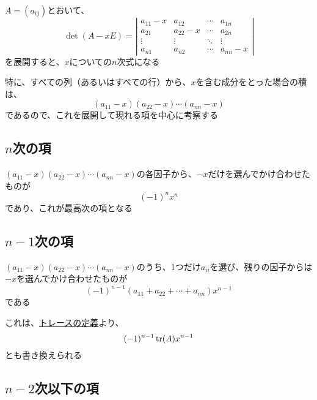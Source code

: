 \documentclass[../../../topic_linear-algebra]{subfiles}
\begin{document}
\sectionline

$A = (a_{ij})$とおいて、
\begin{equation*}
  \det(A - xE ) = \left|\begin{matrix}
    a_{11} - x & a_{12}     & \cdots & a_{1n}     \\
    a_{21}     & a_{22} - x & \cdots & a_{2n}     \\
    \vdots     & \vdots     & \ddots & \vdots     \\
    a_{n1}     & a_{n2}     & \cdots & a_{nn} - x
  \end{matrix}\right|
\end{equation*}
を展開すると、$x$についての$n$次式になる

特に、すべての列（あるいはすべての行）から、$x$を含む成分をとった場合の積は、
\begin{equation*}
  (a_{11} - x)(a_{22} - x) \cdots (a_{nn} - x)
\end{equation*}
であるので、これを展開して現れる項を中心に考察する

\subsection{$n$次の項}

$(a_{11} - x)(a_{22} - x) \cdots (a_{nn} - x)$の各因子から、$-x$だけを選んでかけ合わせたものが
\begin{equation*}
  (-1)^n x^n
\end{equation*}
であり、これが最高次の項となる

\subsection{$n-1$次の項}

$(a_{11} - x)(a_{22} - x) \cdots (a_{nn} - x)$のうち、1つだけ$a_{ii}$を選び、残りの因子からは$-x$を選んでかけ合わせたものが
\begin{equation*}
  (-1)^{n-1} (a_{11} + a_{22} + \cdots + a_{nn}) x^{n-1}
\end{equation*}
である

これは、\hyperref[def:trace]{トレースの定義}より、
\begin{equation*}
  (-1)^{n-1} \tr(A) x^{n-1}
\end{equation*}
とも書き換えられる

\subsection{$n-2$次以下の項}
\end{document}
